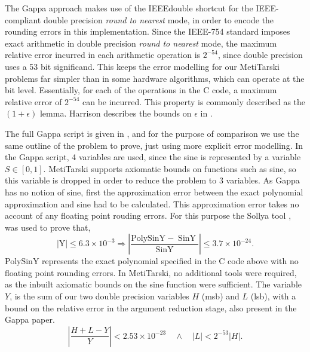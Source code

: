 \documentclass{fac}
\begin{document}
The Gappa approach makes use of the IEEEdouble shortcut for the IEEE-compliant double precision \textit{round to nearest} mode, in order to encode the rounding errors in this implementation. Since the IEEE-754 standard imposes exact arithmetic in double precision \textit{round to nearest} mode, the maximum relative error incurred in each arithmetic operation is $2^{-54}$, since double precision uses a 53 bit significand. This keeps the error modelling for our MetiTarski problems far simpler than in some hardware algorithms, which can operate at the bit level. Essentially, for each of the operations in the C code, a maximum relative error of $2^{-54}$ can be incurred. This property is commonly described as the $(1+\epsilon)$ lemma. Harrison describes the bounds on $\epsilon$ in \cite{harrison2006floating}.

The full Gappa script is given in \cite{5483294}, and for the purpose of comparison we use the same outline of the problem to prove, just using more explicit error modelling. In the Gappa script, 4 variables are used, since the sine is represented by a variable $S\in[0,1]$. MetiTarski supports axiomatic bounds on functions such as sine, so this variable is dropped in order to reduce the problem to 3 variables. As Gappa has no notion of sine, first the approximation error between the exact polynomial approximation and sine had to be calculated. This approximation error takes no account of any floating point rouding errors. For this purpose the Sollya tool \cite{ChevillardJoldesLauter2010}, was used to prove that,
\begin{equation}
|\mathrm{Y}| \leq 6.3 \times 10^{-3} \Rightarrow\left|\frac{\mathrm{PolySinY}-\operatorname{SinY}}{\operatorname{SinY}}\right| \leq 3.7 \times 10^{-24}.
\end{equation}
PolySinY represents the exact polynomial specified in the C code above with no floating point rounding errors. In MetiTarski, no additional tools were required, as the inbuilt axiomatic bounds on the sine function were sufficient. The variable $Y$, is the sum of our two double precision variables $H$ (msb) and $L$ (lsb), with a bound on the relative error in the argument reduction stage, also present in the Gappa paper.
\begin{equation*}
    \left|\frac{H+L-Y}{Y}\right| < 2.53\times 10^{-23} \quad \land \quad |L|<2^{-53}|H|.
\end{equation*}
\end{document}
